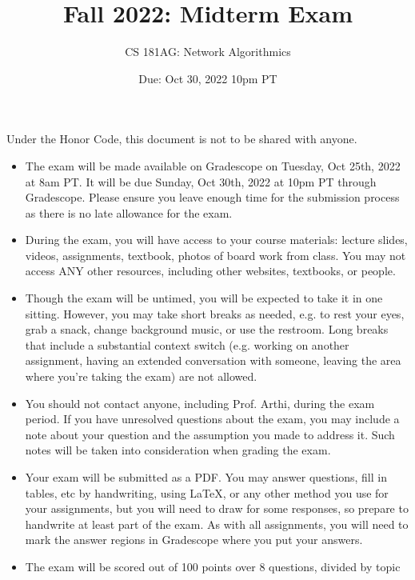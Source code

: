 \documentclass[10pt]{article}
\date{Due: Oct 30, 2022 10pm PT}
\begin{document}
 
\title{Fall 2022: Midterm Exam}
\author{
CS 181AG: Network Algorithmics}
\maketitle

Under the Honor Code, this document is not to be shared with anyone.

\begin{itemize}

\item The exam will be made available on Gradescope on Tuesday, Oct 25th, 2022 at 8am PT. It will be due Sunday, Oct 30th, 2022 at 10pm PT through Gradescope. Please ensure you leave enough time for the submission process as there is no late allowance for the exam.

\item During the exam, you will have access to your course materials: lecture slides, videos, assignments, textbook, photos of board work from class. You may not access ANY other resources, including other websites, textbooks, or people.

\item Though the exam will be untimed, you will be expected to take it in one sitting. However, you may
take short breaks as needed, e.g. to rest your eyes, grab a snack, change background music, or use the
restroom. Long breaks that include a substantial context switch (e.g. working on another assignment,
having an extended conversation with someone, leaving the area where you’re taking the exam) are
not allowed.

\item You should not contact anyone, including Prof. Arthi, during the exam period. If you have unresolved
questions about the exam, you may include a note about your question and the assumption you made
to address it. Such notes will be taken into consideration when grading the exam.

\item Your exam will be submitted as a PDF. You may answer questions, fill in tables, etc by handwriting, using LaTeX, or any other method you use for your assignments, but you will need to draw for some responses, so prepare to handwrite at least part of the exam. As with all assignments, you will need to mark the answer regions in Gradescope where you put your answers.

\item The exam will be scored out of 100 points over 8 questions, divided by topic

\end{itemize}
\end{document}
